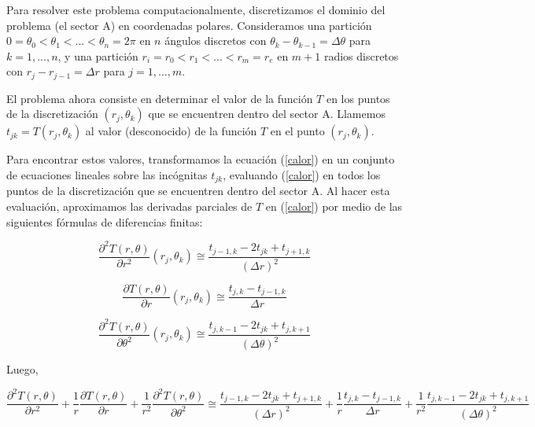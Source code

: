 \medskip

Para resolver este problema computacionalmente, discretizamos el dominio del problema (el sector A) en coordenadas polares. Consideramos una partici\'on $0 = \theta_0 < \theta_1 < ... < \theta_n = 2\pi$ en $n$ \'angulos discretos con $\theta_k-\theta_{k-1} = \Delta\theta$ para $k = 1,...,n$, y una partici\'on $r_i = r_0 < r_1 < ... < r_m = r_e$ en $m+1$ radios discretos con $r_j - r_{j-1} = \Delta r$ para $j = 1,...,m$.

\medskip

El problema ahora consiste en determinar el valor de la funci\'on $T$ en los puntos de la discretizaci\'on $(r_j,\theta_k)$ que se encuentren dentro del sector A. Llamemos $t_{jk} = T(r_j,\theta_k)$ al valor (desconocido) de la funci\'on $T$ en el punto $(r_j,\theta_k)$.

\medskip

Para encontrar estos valores, transformamos la ecuaci\'on (\ref{calor}) en un conjunto de ecuaciones lineales sobre las inc\'ognitas $t_{jk}$, evaluando (\ref{calor}) en todos los puntos de la discretizaci\'on que se encuentren dentro del sector A. Al hacer esta evaluaci\'on, aproximamos las derivadas parciales de $T$ en (\ref{calor}) por medio de las siguientes f\'ormulas de diferencias finitas:


\begin{equation}
\frac{\partial^2T(r,\theta)}{\partial r^2}(r_j,\theta_k) \cong \frac{t_{j-1,k}-2t_{jk}+t_{j+1,k}}{(\Delta r)^2}
\end{equation}

\begin{equation}
\frac{\partial T(r,\theta)}{\partial r}(r_j,\theta_k) \cong \frac{t_{j,k}-t_{j-1,k}}{\Delta r}
\end{equation}

\begin{equation}
\frac{\partial^2T(r,\theta)}{\partial \theta^2}(r_j,\theta_k) \cong \frac{t_{j,k-1}-2t_{jk}+t_{j,k+1}}{(\Delta \theta)^2}
\end{equation}

Luego,

\begin{equation}\label{calor_discretizada}
\frac{\partial^2T(r,\theta)}{\partial r^2}+\frac{1}{r}\frac{\partial T(r,\theta)}{\partial r}+\frac{1}{r^2}\frac{\partial^2T(r,\theta)}{\partial \theta^2} \cong \frac{t_{j-1,k}-2t_{jk}+t_{j+1,k}}{(\Delta r)^2} + \frac{1}{r}\frac{t_{j,k}-t_{j-1,k}}{\Delta r} + \frac{1}{r^2}\frac{t_{j,k-1}-2t_{jk}+t_{j,k+1}}{(\Delta \theta)^2}
\end{equation}

